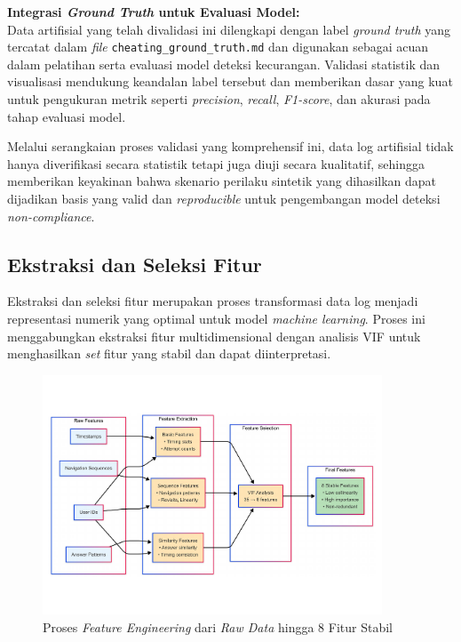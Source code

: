 \textbf{Integrasi \textit{Ground Truth} untuk Evaluasi Model:} \\
Data artifisial yang telah divalidasi ini dilengkapi dengan label \textit{ground truth} yang tercatat dalam \textit{file} \texttt{cheating\_ground\_truth.md} dan digunakan sebagai acuan dalam pelatihan serta evaluasi model deteksi kecurangan. Validasi statistik dan visualisasi mendukung keandalan label tersebut dan memberikan dasar yang kuat untuk pengukuran metrik seperti \textit{precision}, \textit{recall}, \textit{F1-score}, dan akurasi pada tahap evaluasi model.

Melalui serangkaian proses validasi yang komprehensif ini, data log artifisial tidak hanya diverifikasi secara statistik tetapi juga diuji secara kualitatif, sehingga memberikan keyakinan bahwa skenario perilaku sintetik yang dihasilkan dapat dijadikan basis yang valid dan \textit{reproducible} untuk pengembangan model deteksi \textit{non-compliance}.

\subsection{Ekstraksi dan Seleksi Fitur}
\label{sec:featureEngineering}
Ekstraksi dan seleksi fitur merupakan proses transformasi data log menjadi representasi numerik yang optimal untuk model \textit{machine learning}. Proses ini menggabungkan ekstraksi fitur multidimensional dengan analisis VIF untuk menghasilkan \textit{set} fitur yang stabil dan dapat diinterpretasi. 

\begin{figure}[htbp]
    \centering
    \includegraphics[width=0.9\textwidth]{figures/feature_engineering_process.pdf}
    \caption{Proses \textit{Feature Engineering} dari \textit{Raw Data} hingga 8 Fitur Stabil}
    \label{fig:feature_engineering_process}
\end{figure}

